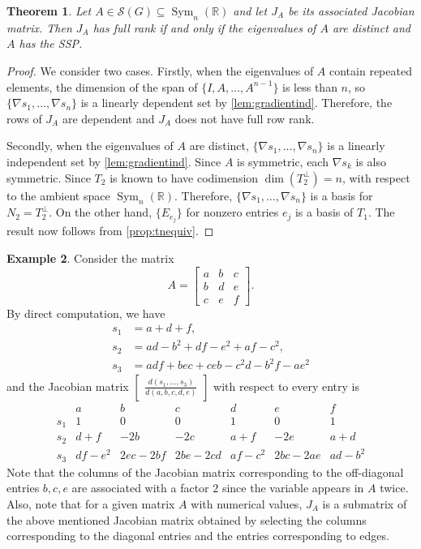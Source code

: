 \documentclass{article}
\newtheorem{theorem}{Theorem}[section]
\theoremstyle{definition}
\newtheorem{example}[theorem]{Example}
\newcommand{\msym}[1][n]{\operatorname{Sym}_{#1}(\mathbb{R})}
\newcommand{\mptn}{\mathcal{S}}
\begin{document}
\begin{theorem}
Let $A\in\mptn(G)\subseteq\msym$ and let $J_A$ be its  associated Jacobian matrix. Then $J_A$ has full rank if and only if the eigenvalues of $A$ are distinct and $A$ has the SSP.
\end{theorem}
\begin{proof}
We consider two cases.  Firstly, when the eigenvalues of $A$ contain repeated elements, the dimension of the span of $\{I, A, \ldots, A^{n-1}\}$ is less than $n$, so $\{\nabla s_1, \ldots, \nabla s_n\}$ is a linearly dependent set by \cref{lem:gradientind}.  Therefore, the rows of $J_A$ are dependent and $J_A$ does not have full row rank.  

Secondly, when the eigenvalues of $A$ are distinct, $\{\nabla s_1, \ldots, \nabla s_n\}$ is a linearly independent set by \cref{lem:gradientind}.  Since $A$ is symmetric, each $\nabla s_k$ is also symmetric. Since $T_2$ is known to have codimension $\dim(T_2^\perp) = n$, with respect to the ambient space $\msym$.  Therefore, $\{\nabla s_1, \ldots, \nabla s_n\}$ is a basis for $N_2 = T_2^\perp$.  On the other hand, $\{E_{e_j}\}$ for nonzero entries $e_j$ is a basis of $T_1$.  The result now follows from \cref{prop:tnequiv}.
\end{proof}

\begin{example}
\label{ex:a3jac}
Consider the matrix 
\[
    A = \begin{bmatrix}
        a & b & c \\
        b & d & e \\
        c & e & f
    \end{bmatrix}.
\]
By direct computation, we have 
\[
    \begin{aligned}
        s_1 &= a + d + f, \\
        s_2 &= ad - b^2 + df - e^2 + af - c^2, \\
        s_3 &= adf + bec + ceb - c^2d - b^2f - ae^2
    \end{aligned}
\]
and the Jacobian matrix $\begin{bmatrix}\frac{d (s_1, \ldots, s_3)}{d (a,b,c,d,e)}\end{bmatrix}$ with respect to every entry is 
\[
    \begin{array}{c|cccccc}
        ~ & a & b & c & d & e & f \\
        \hline
        s_1 & 1 & 0 & 0 & 1 & 0 & 1 \\
        s_2 & d+f & -2b & -2c & a+f & -2e & a+d \\
        s_3 & df-e^2 & 2ec-2bf & 2be-2cd & af-c^2 & 2bc-2ae & ad-b^2
    \end{array}
\]
Note that the columns of the Jacobian matrix corresponding to the off-diagonal entries $b,c,e$ are associated with a factor $2$ since the variable appears in $A$ twice.  Also, note that for a given matrix $A$ with numerical values, $J_A$ is a submatrix of the above mentioned Jacobian matrix obtained by selecting the columns corresponding to the diagonal entries and the entries corresponding to edges. 
\end{example}
\end{document}
